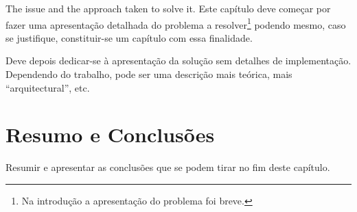 The issue and the approach taken to solve it.
Este capítulo deve começar por fazer uma apresentação detalhada do
problema a resolver\footnote{Na introdução a apresentação do
  problema foi breve.} podendo mesmo, caso se justifique,
constituir-se um capítulo com essa finalidade.

Deve depois dedicar-se à apresentação da solução sem detalhes de
implementação. 
Dependendo do trabalho, pode ser uma descrição mais teórica, mais
``arquitectural'', etc.

\section{Resumo e Conclusões}

Resumir e apresentar as conclusões que se podem tirar no fim deste
capítulo.
